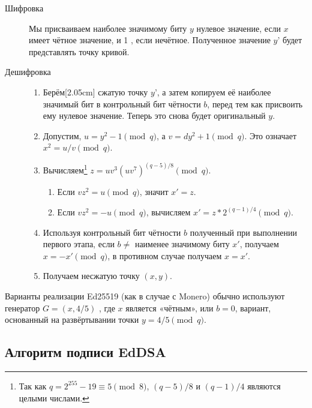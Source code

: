 \begin{description}
	\item[Шифровка] Мы присваиваем наиболее значимому биту $y$ нулевое значение, если $x$ имеет чётное значение, и 1 , если нечётное. Полученное значение $y’$ будет представлять точку кривой.
	
	\item[Дешифровка] \hfill
	    \begin{enumerate}
    	    \item Берём[2.05cm] сжатую точку $y’$, а затем копируем её наиболее значимый бит в контрольный бит чётности $b$, перед тем как присвоить ему нулевое значение. Теперь это снова будет оригинальный $y$.
    	    \item Допустим, \(u = y^2-1 \pmod q\), а \(v = d y^2  + 1 \pmod q\). Это означает $x^2 = u/v \pmod q$.
    	    \item Вычисляем\footnote{Так как $q = 2^{255}-19 \equiv 5 \pmod{8}$, $(q-5)/8$ и $(q-1)/4$ являются целыми числами.} \(z = u v^3 (u v^7)^{(q-5)/8} \pmod q\).
            \begin{enumerate}
                \item Если \(v z^2 = u \pmod q\), значит \(x' = z\).
                \item Если \(v z^2 = -u \pmod q\), вычисляем \(x' = z*2^{(q-1)/4} \pmod q\).
            \end{enumerate}
            \item Используя контрольный бит чётности \(b\) полученный при выполнении первого этапа, если $b \ne$ наименее значимому биту $x'$, получаем  \(x = -x' \pmod q\), в противном случае получаем \(x = x'\).
            \item Получаем несжатую точку $(x,y)$.
	    \end{enumerate}
\end{description}

Варианты реализации Ed25519 (как в случае с Monero) обычно используют генератор $G = (x,4/5)$ \cite{Bernstein2012}, где $x$ является «чётным», или $b = 0$, вариант, основанный на развёртывании точки \(y = 4/5 \pmod q\).


\subsection{Алгоритм подписи EdDSA}
\label{EdDSA_section}

